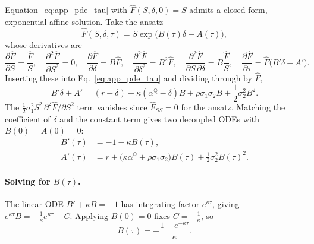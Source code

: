 \documentclass[11pt, a4paper]{article}
\newcommand{\convyield}{\delta}             %
\newcommand{\meanrev}{\kappa}               %
\newcommand{\longrun}{\alpha}               %
\begin{document}
Equation~\ref{eq:app_pde_tau} with $\hat{F}(S, \convyield, 0) = S$ admits a closed-form, exponential-affine solution. Take the ansatz
\begin{equation}
  \label{eq:app_ansatz}
  \hat{F}(S, \convyield, \tau) = S\exp\!\big(B(\tau)\convyield + A(\tau)\big),
\end{equation}
\noindent
whose derivatives are
\begin{equation}
  \label{eq:app_derivs}
  \frac{\partial \hat{F}}{\partial S} = \frac{\hat{F}}{S},
  \quad
  \frac{\partial^2 \hat{F}}{\partial S^2} = 0,
  \quad
  \frac{\partial \hat{F}}{\partial \convyield} = B\hat{F},
  \quad
  \frac{\partial^2 \hat{F}}{\partial \convyield^2} = B^2\hat{F},
  \quad
  \frac{\partial^2 \hat{F}}{\partial S\,\partial \convyield} = B\frac{\hat{F}}{S},
  \quad
  \frac{\partial \hat{F}}{\partial \tau} = \hat{F}\big(B'\convyield + A'\big).
\end{equation}
\noindent
Inserting these into Eq.~\ref{eq:app_pde_tau} and dividing through by $\hat{F}$,
\begin{equation}
  \label{eq:app_substituted}
  B'\convyield + A'
  = (r - \convyield)
  + \meanrev(\longrun^{\mathbb{Q}} - \convyield)B
  + \rho\sigma_1\sigma_2 B
  + \frac{1}{2}\sigma_2^2 B^2.
\end{equation}
\noindent
The $\tfrac{1}{2}\sigma_1^2 S^2\,\partial^2\hat{F}/\partial S^2$ term vanishes since $\hat{F}_{SS} = 0$ for the ansatz. Matching the coefficient of $\convyield$ and the constant term gives two decoupled ODEs with $B(0) = A(0) = 0$:
\begin{align}
  \label{eq:app_ode_B}
  B'(\tau) &= -1 - \meanrev B(\tau), \\
  \label{eq:app_ode_A}
  A'(\tau) &= r + \big(\meanrev\longrun^{\mathbb{Q}} + \rho\sigma_1\sigma_2\big)B(\tau) + \frac{1}{2}\sigma_2^2 B(\tau)^2.
\end{align}

\paragraph{Solving for $B(\tau)$.} The linear ODE $B' + \meanrev B = -1$ has integrating factor $e^{\meanrev\tau}$, giving $e^{\meanrev\tau}B = -\tfrac{1}{\meanrev}e^{\meanrev\tau} - C$. Applying $B(0) = 0$ fixes $C = -\tfrac{1}{\meanrev}$, so
\begin{equation}
  \label{eq:app_B}
  B(\tau) = -\frac{1 - e^{-\meanrev\tau}}{\meanrev}.
\end{equation}
\end{document}
